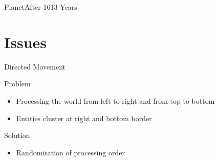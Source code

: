 \documentclass{beamer}
\begin{document}
\begin{frame}{Planet}{After 1613 Years}
    \begin{center}
    \end{center}
\end{frame}

\section{Issues}

\begin{frame}{Directed Movement}
    \begin{block}{Problem}
        \begin{itemize}
            \item Processing the world from left to right and from top to bottom
            \item Entities cluster at right and bottom border
        \end{itemize}
    \end{block}
    \begin{block}{Solution}
        \begin{itemize}
            \item Randomisation of processing order
        \end{itemize}
    \end{block}
\end{frame}
\end{document}
